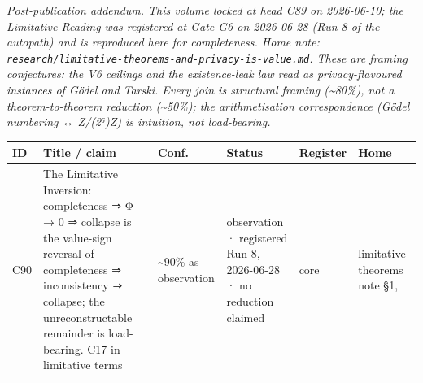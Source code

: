 \documentclass[
]{article}
\newcounter{none} %
\begin{document}
\emph{Post-publication addendum. This volume locked at head C89 on
2026-06-10; the Limitative Reading was registered at Gate G6 on
2026-06-28 (Run 8 of the autopath) and is reproduced here for
completeness. Home note:
\texttt{research/limitative-theorems-and-privacy-is-value.md}. These are
framing conjectures: the V6 ceilings and the existence-leak law read as
privacy-flavoured instances of Gödel and Tarski. Every join is
structural framing (\textasciitilde80\%), not a theorem-to-theorem
reduction (\textasciitilde50\%); the arithmetisation correspondence
(Gödel numbering ↔ Z/(2⁶)Z) is intuition, not load-bearing.}

{\def\LTcaptype{none} %
\begin{longtable}[]{@{}
  >{\raggedright\arraybackslash}p{}
  >{\raggedright\arraybackslash}p{}
  >{\raggedright\arraybackslash}p{}
  >{\raggedright\arraybackslash}p{}
  >{\raggedright\arraybackslash}p{}
  >{\raggedright\arraybackslash}p{}@{}}
\toprule\noalign{}
\begin{minipage}[b]{\linewidth}\raggedright
ID
\end{minipage} & \begin{minipage}[b]{\linewidth}\raggedright
Title / claim
\end{minipage} & \begin{minipage}[b]{\linewidth}\raggedright
Conf.
\end{minipage} & \begin{minipage}[b]{\linewidth}\raggedright
Status
\end{minipage} & \begin{minipage}[b]{\linewidth}\raggedright
Register
\end{minipage} & \begin{minipage}[b]{\linewidth}\raggedright
Home
\end{minipage} \\
\midrule\noalign{}
\endhead
\bottomrule\noalign{}
\endlastfoot
C90 & The Limitative Inversion: completeness ⇒ Φ → 0 ⇒ collapse is the
value-sign reversal of completeness ⇒ inconsistency ⇒ collapse; the
unreconstructable remainder is load-bearing. C17 in limitative terms &
\textasciitilde90\% as observation & observation · registered Run 8,
2026-06-28 · no reduction claimed & core & limitative-theorems note §1,

\end{longtable}}
\end{document}
